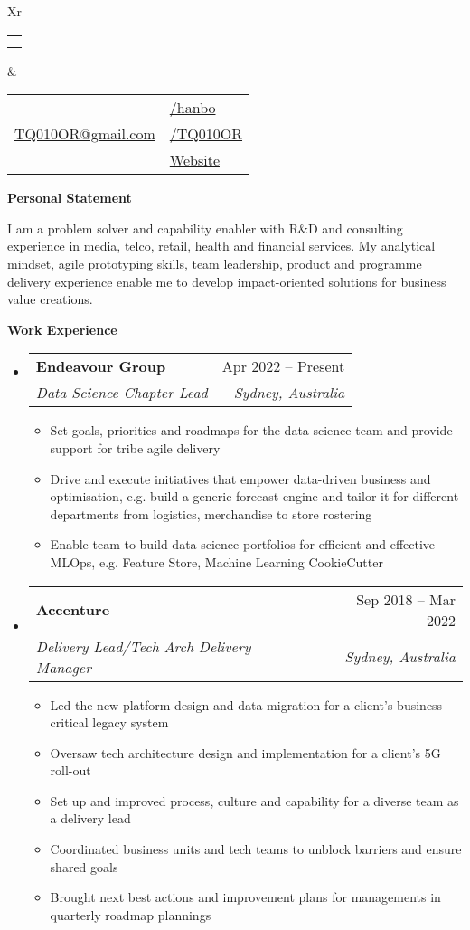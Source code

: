 \documentclass[letterpaper,12pt]{article}[leftmargin=*]
\makeatletter
\def \fullname {Bo HAN}
\def \subtitle {}
\def \linkedinicon {\faLinkedin}
\def \linkedinlink {https://linkedin.com/in/hanbo/}
\def \linkedintext {/hanbo}
\def \phoneicon {\faPhone}
\def \phonetext {+61-425-719-696}
\def \emailicon {\faEnvelope}
\def \emaillink {mailto:tq010or@gmail.com}
\def \emailtext {TQ010OR@gmail.com}
\def \githubicon {\faGithub}
\def \githublink {https://github.com/tq010or}
\def \githubtext {/TQ010OR}
\def \websiteicon {\faGlobe}
\def \websitelink {http://tq010or.github.io/}
\def \websitetext {Website}
\def \headertype {\doublecol} %
\def \entryspacing {-0pt}
\def \linkedin {\linkedinicon \hspace{3pt}\href{\linkedinlink}{\linkedintext}}
\def \phone {\phoneicon \hspace{3pt}{ \phonetext}}
\def \email {\emailicon \hspace{3pt}\href{\emaillink}{\emailtext}}
\def \github {\githubicon \hspace{3pt}\href{\githublink}{\githubtext}}
\def \website {\websiteicon \hspace{3pt}\href{\websitelink}{\websitetext}}
\renewcommand{\section}[2]{\vspace{5pt}
  \colorbox{secondary}{\color{white}\raggedbottom\normalsize\textbf{{#1}{\hspace{7pt}#2}}}
}
\newcommand{\resumeEntryStart}{\begin{itemize}[leftmargin=2.5mm]}
\newcommand{\resumeEntryEnd}{\end{itemize}\vspace{\entryspacing}}
\newcommand{\resumeItemListStart}{\begin{itemize}[leftmargin=4.5mm]}
\newcommand{\resumeItemListEnd}{\end{itemize}}
\newcommand{\resumeItem}[1]{
  \item\small{
    {#1 \vspace{-2pt}}
  }
}
\newcommand{\resumeText}[1]{
  \small{
    {#1 \vspace{-2pt}}
  }
}
\newcommand{\resumeEntryTSDL}[4]{
  \vspace{-1pt}\item[]
    \begin{tabularx}{0.97\textwidth}{X@{\hspace{60pt}}r}
      \textbf{\color{primary}#1} & {\firabook\color{accent}\small#2} \\
      \textit{\color{accent}\small#3} & \textit{\color{accent}\small#4} \\
    \end{tabularx}\vspace{-6pt}
}
\newcommand{\doublecol}[6]{
  \begin{tabularx}{\textwidth}{Xr}
    {
      \begin{tabular}[c]{l}
        \fontsize{35}{45}\selectfont{\color{primary}{{\textbf{\fullname}}}} \\
        {\textit{\subtitle}} %
      \end{tabular}
    } & {
      \begin{tabular}[c]{l@{\hspace{1.5em}}l}
        {\small#4} & {\small#1} \\
        {\small#5} & {\small#2} \\
        {\small#6} & {\small#3}
      \end{tabular}
    }
  \end{tabularx}
}
\newcommand{\singlecol}[6]{
  \begin{tabularx}{\textwidth}{Xr}
    {
      \begin{tabular}[b]{l}
        \fontsize{35}{45}\selectfont{\color{primary}{{\textbf{\fullname}}}} \\
        {\textit{\subtitle}} %
      \end{tabular}
    } & {
      \begin{tabular}[c]{l}
        {\small#1} \\
        {\small#2} \\
        {\small#3} \\
        {\small#4} \\
        {\small#5} \\
        {\small#6}
      \end{tabular}
    }
  \end{tabularx}
}
\makeatother
\begin{document}


\headertype{\linkedin}{\github}{\website}{\phone}{\email}{} %
\vspace{-10pt} %

\section{\faFlask}{Personal Statement}

    \resumeText{I am a problem solver and capability enabler with R\&D and consulting experience in media, telco, retail, health and financial services. My analytical mindset, agile prototyping skills, team leadership, product and programme delivery experience enable me to develop impact-oriented solutions for business value creations.}

\section{\faPieChart}{Work Experience}
  \resumeEntryStart
    \resumeEntryTSDL
      {Endeavour Group}{Apr 2022 -- Present}
      {Data Science Chapter Lead}{Sydney, Australia}
    \resumeItemListStart
      \resumeItem {Set goals, priorities and roadmaps for the data science team and provide support for tribe agile delivery}
      \resumeItem {Drive and execute initiatives that empower data-driven business and optimisation, e.g. build a generic forecast engine and tailor it for different departments from logistics, merchandise to store rostering}
      \resumeItem {Enable team to build data science portfolios for efficient and effective MLOps, e.g. Feature Store, Machine Learning CookieCutter}
    \resumeItemListEnd
  \resumeEntryEnd


  \resumeEntryStart
    \resumeEntryTSDL
      {Accenture}{Sep 2018 -- Mar 2022}
      {Delivery Lead/Tech Arch Delivery Manager}{Sydney, Australia}
    \resumeItemListStart
      \resumeItem {Led the new platform design and data migration for a client's business critical legacy system}
      \resumeItem {Oversaw tech architecture design and implementation for a client's 5G roll-out}
      \resumeItem {Set up and improved process, culture and capability for a diverse team as a delivery lead}
      \resumeItem {Coordinated business units and tech teams to unblock barriers and ensure shared goals}
      \resumeItem {Brought next best actions and improvement plans for managements in quarterly roadmap plannings}
    \resumeItemListEnd
  \resumeEntryEnd
\end{document}
